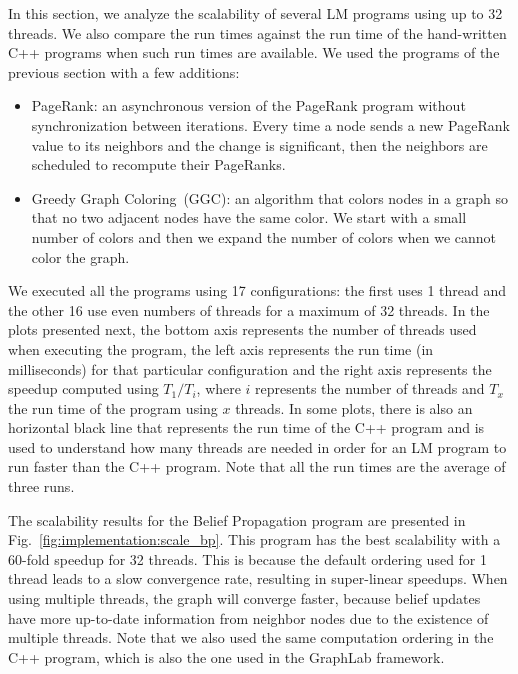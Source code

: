 In this section, we analyze the scalability of several LM programs using up to
32 threads. We also compare the run times against the run time of the
hand-written C++ programs when such run times are available. We used the
programs of the previous section with a few additions:

\begin{itemize}

      \item PageRank: an asynchronous version of the PageRank program without
         synchronization between iterations. Every time a node sends a new
         PageRank value to its neighbors and the change is significant, then the
         neighbors are scheduled to recompute their PageRanks.

      \item Greedy Graph Coloring~(GGC): an algorithm that colors nodes in a
         graph so that no two adjacent nodes have the same color. We start with
         a small number of colors and then we expand the number of colors when
         we cannot color the graph.

\end{itemize}

We executed all the programs using 17 configurations: the first uses 1 thread
and the other 16 use even numbers of threads for a maximum of 32 threads. In the
plots presented next, the bottom axis represents the number of threads used when
executing the program, the left axis represents the run time (in milliseconds)
for that particular configuration and the right axis represents the speedup
computed using $T_1/T_i$, where $i$ represents the number of threads and
$T_x$ the run time of the program using $x$ threads.  In some plots, there is
also an horizontal black line that represents the run time of the C++ program
and is used to understand how many threads are needed in order for an LM program
to run faster than the C++ program. Note that all the run times are the average
of three runs.

The scalability results for the Belief Propagation program are presented in
Fig.~\ref{fig:implementation:scale_bp}. This program has the best scalability
with a 60-fold speedup for 32 threads. This is because the default ordering used
for 1 thread leads to a slow convergence rate, resulting in super-linear
speedups. When using multiple threads, the graph will converge faster, because
belief updates have more up-to-date information from neighbor nodes due to the
existence of multiple threads.  Note that we also used the same computation
ordering in the C++ program, which is also the one used in the GraphLab
framework.

